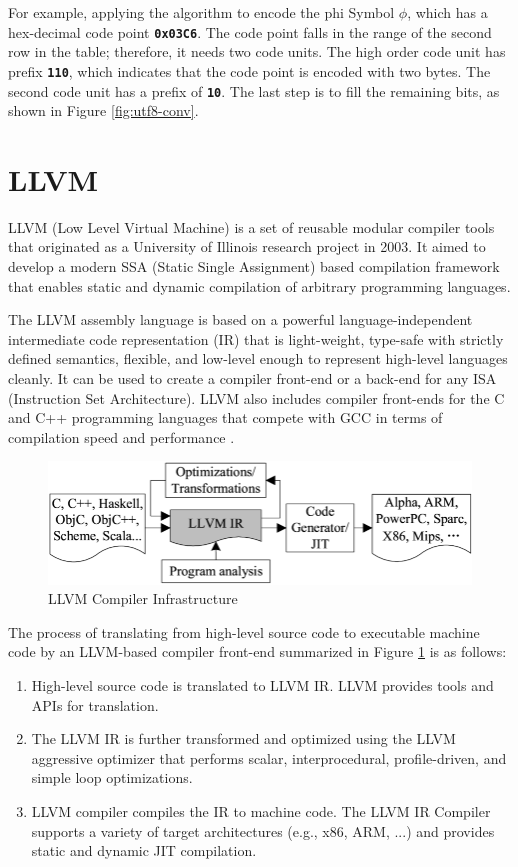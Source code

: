 For example, applying the algorithm to encode the phi Symbol $\phi$, which has a hex-decimal code point \texttt{\textbf{0x03C6}}. The code point falls in the range of the second row in the table; therefore, it needs two code units. The high order code unit has prefix \texttt{\textbf{110}}, which indicates that the code point is encoded with two bytes. The second code unit has a prefix of \texttt{\textbf{10}}. The last step is to fill the remaining bits, as shown in Figure \ref{fig:utf8-conv}.

\section{LLVM}
LLVM (Low Level Virtual Machine) \cite{llvm} is a set of reusable modular compiler tools that originated as a University of Illinois research project in 2003. It aimed to develop a modern SSA (Static Single Assignment) based compilation framework that enables static and dynamic compilation of arbitrary programming languages.

The LLVM assembly language is based on a powerful language-independent intermediate code representation (IR) that is light-weight, type-safe with strictly defined semantics, flexible, and low-level enough to represent high-level languages cleanly. It can be used to create a compiler front-end or a back-end for any ISA (Instruction Set Architecture). LLVM also includes compiler front-ends for the C and C++ programming languages that compete with GCC in terms of compilation speed and performance \cite{llvmgcc}.

\begin{figure}[ht]
\includegraphics[width=\textwidth]{imgs/llvm-arch.png}
\caption[LLVM Compiler Infrastructure]{LLVM Compiler Infrastructure \cite{llvminfra}}\label{fig:llvminfra}
\end{figure}

The process of translating from high-level source code to executable machine code by an LLVM-based compiler front-end summarized in Figure \ref{fig:llvminfra} is as follows:
\begin{enumerate}
    \item High-level source code is translated to LLVM IR. LLVM provides tools and APIs for translation.
    \item The LLVM IR is further transformed and optimized using the LLVM aggressive optimizer that performs scalar, interprocedural, profile-driven, and simple loop optimizations.
    \item LLVM compiler compiles the IR to machine code. The LLVM IR Compiler supports a variety of target architectures (e.g., x86, ARM, ...) and provides static and dynamic JIT compilation.
\end{enumerate}

